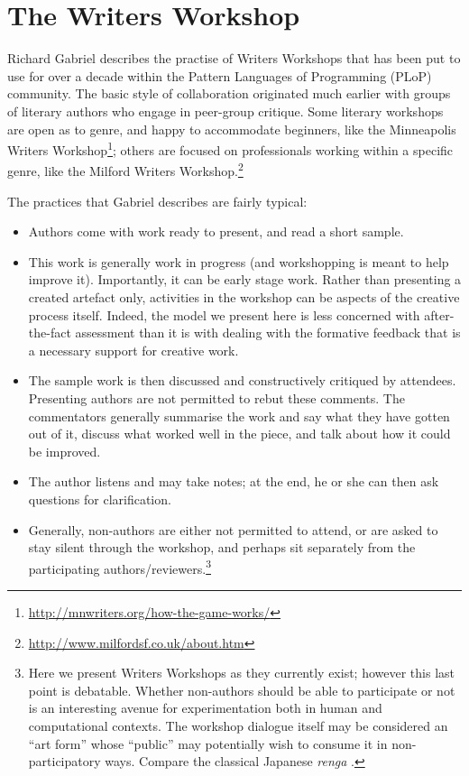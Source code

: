 \section{The Writers Workshop} \label{sec:writers-workshop}

Richard Gabriel \citeyear{gabriel2002writer} describes the practise of
Writers Workshops that has been put to use for over a decade within
the Pattern Languages of Programming (PLoP) community.  The basic
style of collaboration originated much earlier with groups of literary
authors who engage in peer-group critique.  Some literary workshops
are open as to genre, and happy to accommodate beginners, like the
Minneapolis Writers
Workshop\footnote{\url{http://mnwriters.org/how-the-game-works/}};
others are focused on professionals working within a specific genre,
like the Milford Writers
Workshop.\footnote{\url{http://www.milfordsf.co.uk/about.htm}}

The
practices that Gabriel describes are fairly typical:  
\begin{itemize}
\item Authors come with work ready to present, and read a short
  sample.
\item This work is generally work in progress (and workshopping is
  meant to help improve it).  Importantly, it can be early stage work.
  Rather than presenting a created artefact only, activities in the
  workshop can be aspects of the creative process itself.  Indeed, the
  model we present here is less concerned with after-the-fact
  assessment than it is with dealing with the formative feedback that
  is a necessary support for creative work.
\item The sample work is then
discussed and constructively critiqued by attendees.  Presenting
authors are not permitted to rebut these comments.  The commentators
generally summarise the work and say what they have gotten out of it,
discuss what worked well in the piece, and talk about how it could be
improved.  
\item The author listens and may take notes; at the end, he or
she can then ask questions for clarification.  
\item Generally, non-authors are either not permitted to attend, or
  are asked to stay silent through the workshop, and perhaps sit
  separately from the participating authors/reviewers.\footnote{Here
    we present Writers Workshops as they currently exist; however this
    last point is debatable. Whether non-authors should be able to
    participate or not is an interesting avenue for experimentation
    both in human and computational contexts.  The workshop dialogue
    itself may be considered an ``art form'' whose ``public'' may
    potentially wish to consume it in non-participatory ways.  Compare
    the classical Japanese \emph{renga} \cite{jin1975art}.}
\end{itemize}

